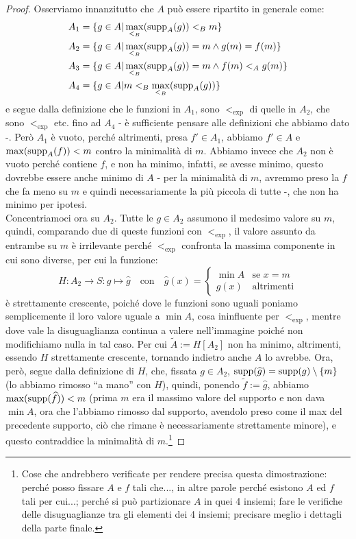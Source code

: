 \begin{proof}
	Osserviamo innanzitutto che $A$ può essere ripartito in generale come:
	\begin{align*}
		&A_1 = \{g \in A |\max_{<_B}(\operatorname{supp}_A(g)) <_B m\} \\
		&A_2 = \{g \in A |\max_{<_B}(\operatorname{supp}_A(g)) = m \land g(m) = f(m)\} \\
		&A_3 = \{g \in A |\max_{<_B}(\operatorname{supp}_A(g)) = m \land f(m) <_A g(m)\} \\
		&A_4 = \{g \in A |m <_B \max_{<_B}(\operatorname{supp}_A(g))\}
	\end{align*}
	e segue dalla definizione che le funzioni in $A_1$, sono $<_{\exp}$ di quelle in $A_2$, che sono $<_{\exp}$ etc. fino ad $A_4$ - è sufficiente pensare alle definizioni che abbiamo dato -.
	Però $A_1$ è vuoto, perché altrimenti, presa $f' \in A_1$, abbiamo $f' \in A$ e $\max(\operatorname{supp}_A(f))<m$ contro la minimalità di $m$.
	Abbiamo invece che $A_2$ non è vuoto perché contiene $f$, e non ha minimo, infatti, se avesse minimo, questo dovrebbe essere anche minimo di $A$ - per la minimalità di $m$, avremmo preso la $f$ che fa meno su $m$ e quindi necessariamente la più piccola di tutte -, che non ha minimo per ipotesi.\\
	Concentriamoci ora su $A_2$. Tutte le $g \in A_2$ assumono il medesimo valore su $m$, quindi, comparando due di queste funzioni con $<_{\exp}$, il valore assunto da entrambe su $m$ 
	è irrilevante perché $<_{\exp}$ confronta la massima componente in cui sono diverse, per cui la funzione:
	\[ H : A_2 \rightarrow S : g \mapsto \widehat{g} \quad\text{con}\quad\widehat{g}(x) = \begin{cases}
		\min A &\text{se $x = m$}\\
		g(x) &\text{altrimenti}
	\end{cases}
		\]
	è strettamente crescente, poiché dove le funzioni sono uguali poniamo semplicemente il loro valore uguale a $\min A$, cosa ininfluente per $<_{\exp}$, mentre dove vale la disuguaglianza continua a valere nell'immagine poiché 
	non modifichiamo nulla in tal caso. Per cui $\widetilde{A} := H[A_2]$ non ha minimo, altrimenti, essendo $H$ strettamente crescente, tornando indietro anche $A$ lo avrebbe.
	Ora, però, segue dalla definizione di $H$, che, fissata $g \in A_2$, $\operatorname{supp}(\widehat{g}) = \operatorname{supp}(g) \setminus \{m\}$ (lo abbiamo rimosso ``a mano'' con $H$), quindi, ponendo $\widetilde{f} := \widehat{g}$, abbiamo $\max(\operatorname{supp}(\widehat{f}))<m$ (prima $m$ era il massimo valore del supporto e non dava $\min A$, ora 
	che l'abbiamo rimosso dal supporto, avendolo preso come il max del precedente supporto, ciò che rimane è necessariamente strettamente minore), e questo contraddice la minimalità di $m$.\footnote{Cose che andrebbero verificate per rendere precisa questa dimostrazione: perché posso fissare $A$ e $f$ tali che..., in altre parole perché esistono $A$ ed $f$ tali per cui...; perché 
	si può partizionare $A$ in quei 4 insiemi; fare le verifiche delle disuguaglianze tra gli elementi dei 4 insiemi; precisare meglio i dettagli della parte finale.}
\end{proof}

